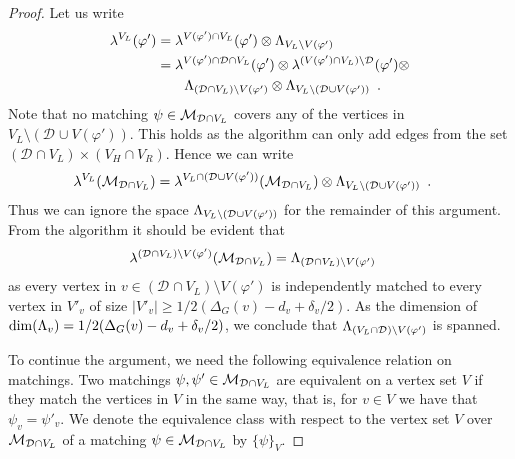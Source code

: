 \documentclass{theoretics}
\newcommand{\set}[1]{\{ #1 \}}
\newcommand{\setsize}[1]{\lvert#1\rvert}
\newcommand{\eqperiod}{\enspace .}
\renewcommand{\deg}[2][XXXXXXXXXXXX]{\Delta_{#1}(#2)}
\newcommand{\ontodimLi}{1/2(\deg[G]{v} - d_v + \delta_v/2)}
\newcommand{\V}[1][]{V_{#1}}
\newcommand{\Vl}{\V[L]}
\newcommand{\Vr}{\V[R]}
\newcommand{\Vh}{\V[H]}
\newcommand{\linspace}[1][]{\ensuremath \Lambda_{{#1}}}
\newcommand{\linmapl}[2][]{\ensuremath \lambda^{{#2}}_{{#1}}}
\newcommand{\linmaplof}[3][]{\linmapl[#1]{#2}(#3)}
\newcommand{\diffclosure}[1][]{D_{{#1}}}
\renewcommand{\diffclosure}[1][]{\mathcal{D}_{{#1}}}
\newcommand{\matchb}{\varphi'}
\newcommand{\matchc}{\psi}
\newcommand{\matchd}{\psi'}
\newcommand{\matchings}[1][]{\ensuremath \mathcal{M}_{{#1}}}
\newcommand{\tensor}{\ensuremath \otimes}
\numberwithin{equation}{section}
\begin{document}
\begin{proof}
  Let us write
  \begin{align}
    \linmaplof{\Vl}{\matchb} 
    &=
    \linmaplof{V(\matchb) \cap \Vl}{\matchb} \tensor \linspace[\Vl
      \setminus V(\matchb)]\\
    &=
    \linmaplof{V(\matchb) \cap \diffclosure \cap \Vl}{\matchb} \tensor
      \linmaplof{(V(\matchb) \cap \Vl) \setminus
      \diffclosure}{\matchb} \tensor\nonumber\\
    &\qquad
      \linspace[(\diffclosure \cap \Vl) \setminus V(\matchb)] \tensor
      \linspace[\Vl \setminus (\diffclosure \cup V(\matchb))] 
      \eqperiod
  \end{align}
  Note that no matching $\matchc \in \matchings[\diffclosure \cap
  \Vl]$ covers any of the vertices in $\Vl \setminus (\diffclosure \cup V(\matchb))$.
  This holds as the algorithm can only add edges from the set
  $(\diffclosure \cap \Vl) \times (\Vh \cap \Vr)$.
  Hence we can write
  \begin{align}
    \linmaplof{\Vl}{\matchings[\diffclosure \cap \Vl]}
    &=
    \linmaplof{\Vl \cap (\diffclosure \cup V(\matchb))}
      {\matchings[\diffclosure \cap \Vl]} \tensor
      \linspace[\Vl \setminus (\diffclosure \cup V(\matchb))]
      \eqperiod
  \end{align}
  Thus we can ignore the space 
  $\linspace[\Vl \setminus (\diffclosure \cup V(\matchb))]$
  for the remainder of this argument.
  From the algorithm it should be evident that
  \begin{align}\label{eq:d_not_def}
    \linmaplof{(\diffclosure \cap \Vl) \setminus V(\matchb)}
      {\matchings[\diffclosure \cap \Vl]}
    &=
      \linspace[(\diffclosure \cap \Vl) \setminus V(\matchb)]
  \end{align}
  as every vertex in 
  $v \in (\diffclosure \cap \Vl) \setminus V(\matchb)$
  is independently matched to every vertex in $V'_{v}$ of size 
  $\setsize{V'_{v}} \ge \ontodimLi$. As the dimension of
  $\dim(\linspace[v]) = \ontodimLi$, we conclude that
  $\linspace[(\Vl \cap \diffclosure) \setminus V(\matchb)]$ is spanned.
  
  To continue the argument, we need the following equivalence relation
  on matchings. Two matchings
  $\matchc, \matchd \in \matchings[\diffclosure \cap \Vl]$ are
  equivalent on a vertex set $V$ if they match the vertices in $V$ in
  the same way, that is, for $v \in V$ we have that
  $\matchc_v = \matchd_v$. We denote the equivalence class with
  respect to the vertex set $V$ over
  $\matchings[\diffclosure \cap \Vl]$ of a matching
  $\matchc\in \matchings[\diffclosure \cap \Vl]$ by $\set{\matchc}_V$.


\end{proof}
\end{document}
